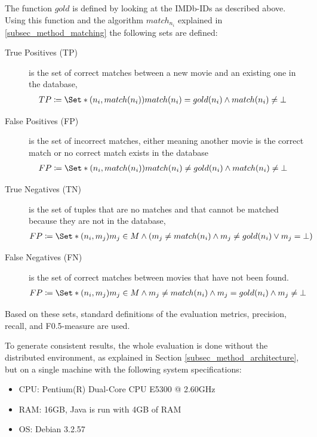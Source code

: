 The function $gold$ is defined by looking at the IMDb-IDs as described above.
Using this function and the algorithm $match_{n_{i}}$ explained in \ref{subsec_method_matching} the following sets are defined:

\begin{description}
\item[True Positives (TP)] is the set of correct matches between a new movie and an existing one in the database,
\begin{align}
TP &\coloneqq \Set*{(n_i, match(n_i))}{match(n_i) = gold(n_i) \land match(n_i) \neq \bot}
\end{align}
\item[False Positives (FP)] is the set of incorrect matches, either meaning another movie is the correct match or no correct match exists in the database
\begin{align}
FP &\coloneqq \Set*{(n_i, match(n_i))}{match(n_i) \neq gold(n_i) \land match(n_i) \neq \bot}
\end{align}
\item[True Negatives (TN)] is the set of tuples that are no matches and that cannot be matched because they are not in the database,
\begin{align}
FP &\coloneqq \Set*{(n_i, m_j)}{m_j \in M \land (m_j \neq match(n_i) \land m_j \neq gold(n_i) \lor m_j = \bot)}
\end{align}
\item[False Negatives (FN)] is the set of correct matches between movies that have not been found.
\begin{align}
FP &\coloneqq \Set*{(n_i, m_j)}{m_j \in M \land m_j \neq match(n_i) \land m_j = gold(n_i) \land m_j \neq \bot}
\end{align}
\end{description}

Based on these sets, standard definitions of the evaluation metrics, precision, recall, and F0.5-measure are used.

To generate consistent results, the whole evaluation is done without the distributed environment, as explained in Section \ref{subsec_method_architecture}, but on a single machine with the following system specifications:
\begin{itemize}
	\item CPU: Pentium(R) Dual-Core  CPU E5300  @ 2.60GHz
	\item RAM: 16GB, Java is run with 4GB of RAM
	\item OS: Debian 3.2.57
\end{itemize}

